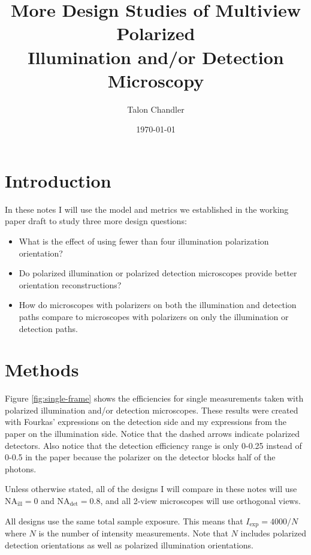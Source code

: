 \documentclass[11pt]{article}
\begin{document}
\title{\vspace{-2.5em} More Design Studies of Multiview Polarized \\Illumination
  and/or Detection Microscopy \vspace{-1em}} \author{Talon
  Chandler}%
\date{\vspace{-1em}\today\vspace{-1em}}
\maketitle
\section{Introduction}
In these notes I will use the model and metrics we established in the working
paper draft to study three more design questions:
\begin{itemize}
\item What is the effect of using fewer than four illumination polarization orientation?
\item Do polarized illumination or polarized detection microscopes provide
  better orientation reconstructions?
\item How do microscopes with polarizers on both the illumination and detection
  paths compare to microscopes with polarizers on only the illumination or
  detection paths.
\end{itemize}

\section{Methods}
Figure \ref{fig:single-frame} shows the efficiencies for single measurements
taken with polarized illumination and/or detection microscopes. These results
were created with Fourkas' expressions on the detection side and my expressions
from the paper on the illumination side. Notice that the dashed arrows indicate
polarized detectors. Also notice that the detection efficiency range is only
0-0.25 instead of 0-0.5 in the paper because the polarizer on the detector
blocks half of the photons.

Unless otherwise stated, all of the designs I will compare in these notes will
use NA${}_{\text{ill}} = 0$ and NA${}_{\text{det}} = 0.8$, and all 2-view
microscopes will use orthogonal views.

All designs use the same total sample exposure. This means that
$I_{\text{exp}} = 4000/N$ where $N$ is the number of intensity
measurements. Note that $N$ includes polarized detection orientations as well as
polarized illumination orientations.
\end{document}
